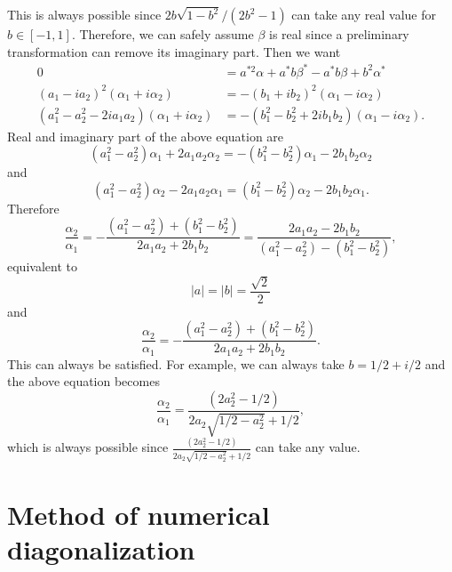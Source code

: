 \documentclass[aps, prb, showpacs, twocolumn, notitlepage, superscriptaddress]{revtex4-1}
\begin{document}
This is always possible since $2b\sqrt{1-b^{2}}/(2b^{2}-1)$ can take
any real value for $b\in[-1,1]$. Therefore, we can safely assume
$\beta$ is real since a preliminary transformation can remove its
imaginary part. Then we want
\begin{align*}
0 & =a^{*2}\alpha+a^{*}b\beta^{*}-a^{*}b\beta+b^{2}\alpha^{*}\\
(a_{1}-ia_{2})^{2}(\alpha_{1}+i\alpha_{2}) & =-(b_{1}+ib_{2})^{2}(\alpha_{1}-i\alpha_{2})\\
(a_{1}^{2}-a_{2}^{2}-2ia_{1}a_{2})(\alpha_{1}+i\alpha_{2}) & =-(b_{1}^{2}-b_{2}^{2}+2ib_{1}b_{2})(\alpha_{1}-i\alpha_{2}).
\end{align*}
Real and imaginary part of the above equation are
\[
(a_{1}^{2}-a_{2}^{2})\alpha_{1}+2a_{1}a_{2}\alpha_{2}=-(b_{1}^{2}-b_{2}^{2})\alpha_{1}-2b_{1}b_{2}\alpha_{2}
\]
and 
\[
(a_{1}^{2}-a_{2}^{2})\alpha_{2}-2a_{1}a_{2}\alpha_{1}=(b_{1}^{2}-b_{2}^{2})\alpha_{2}-2b_{1}b_{2}\alpha_{1}.
\]
Therefore
\[
\frac{\alpha_{2}}{\alpha_{1}}=-\frac{(a_{1}^{2}-a_{2}^{2})+(b_{1}^{2}-b_{2}^{2})}{2a_{1}a_{2}+2b_{1}b_{2}}=\frac{2a_{1}a_{2}-2b_{1}b_{2}}{(a_{1}^{2}-a_{2}^{2})-(b_{1}^{2}-b_{2}^{2})},
\]
equivalent to
\[
|a|=|b|=\frac{\sqrt{2}}{2}
\]
and 
\[
\frac{\alpha_{2}}{\alpha_{1}}=-\frac{(a_{1}^{2}-a_{2}^{2})+(b_{1}^{2}-b_{2}^{2})}{2a_{1}a_{2}+2b_{1}b_{2}}.
\]
This can always be satisfied. For example, we can always take $b=1/2+i/2$
and the above equation becomes
\[
\frac{\alpha_{2}}{\alpha_{1}}=\frac{(2a_{2}^{2}-1/2)}{2a_{2}\sqrt{1/2-a_{2}^{2}}+1/2},
\]
which is always possible since $\frac{(2a_{2}^{2}-1/2)}{2a_{2}\sqrt{1/2-a_{2}^{2}}+1/2}$
can take any value.


\section{Method of numerical diagonalization}
\end{document}
